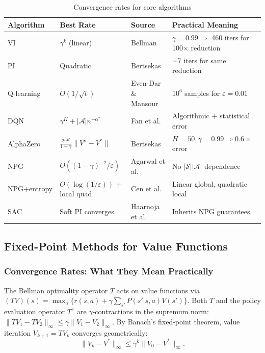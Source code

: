 \begin{table}[h!]
\centering
\caption{Convergence rates for core algorithms}
\label{tab:ch2_convergence_summary}
\small
\begin{tabular}{l|l|l|l}
\hline
Algorithm & Best Rate & Source & Practical Meaning \\
\hline
VI & $\gamma^k$ (linear) & Bellman & $\gamma=0.99 \Rightarrow$ 460 iters for 100$\times$ reduction \\
PI & Quadratic & Bertsekas & $\sim$7 iters for same reduction \\
Q-learning & $\tilde{O}(1/\sqrt{t})$ & Even-Dar \& Mansour & $10^6$ samples for $\varepsilon=0.01$ \\
DQN & $\gamma^K + |\mathcal{A}|n^{-\alpha^*}$ & Fan et al. & Algorithmic + statistical error \\
AlphaZero & $\frac{2\gamma^H}{1-\gamma}\|V^\pi - V^*\|$ & Bertsekas & $H=50, \gamma=0.99 \Rightarrow 0.6\times$ error \\
NPG & $O((1-\gamma)^{-2}/\varepsilon)$ & Agarwal et al. & No $|\mathcal{S}||\mathcal{A}|$ dependence \\
NPG+entropy & $O(\log(1/\varepsilon))$ + local quad & Cen et al. & Linear global, quadratic local \\
SAC & Soft PI converges & Haarnoja et al. & Inherits NPG guarantees \\
\hline
\end{tabular}
\end{table}


\subsection{Fixed-Point Methods for Value Functions}
\label{sec:fixed_point}

\subsubsection{Convergence Rates: What They Mean Practically}

The Bellman optimality operator $T$ acts on value functions via $(TV)(s) = \max_{a} \{ r(s,a) + \gamma \sum_{s'} P(s'|s,a) V(s') \}$. Both $T$ and the policy evaluation operator $T^\pi$ are $\gamma$-contractions in the supremum norm: $\|TV_1 - TV_2\|_\infty \leq \gamma \|V_1 - V_2\|_\infty$. By Banach's fixed-point theorem, value iteration $V_{k+1} = TV_k$ converges geometrically:
\begin{equation}
\|V_k - V^*\|_\infty \leq \gamma^k \|V_0 - V^*\|_\infty.
\label{eq:vi_convergence}
\end{equation}

